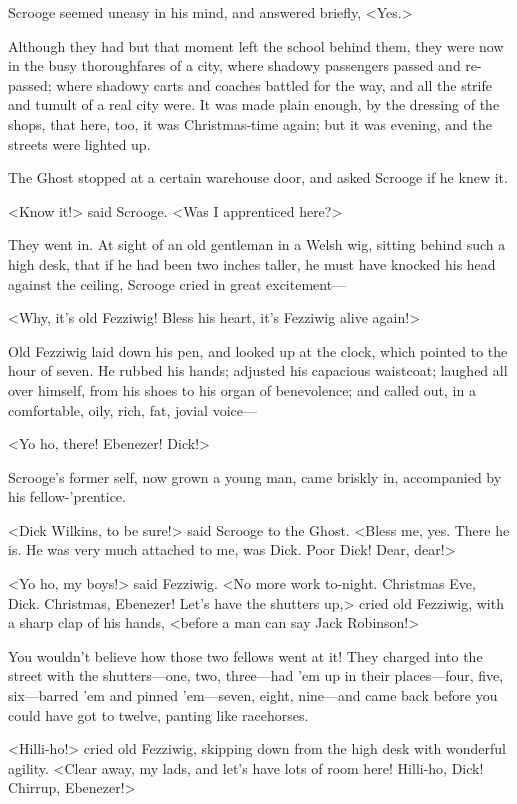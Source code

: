 Scrooge seemed uneasy in his mind, and answered briefly, <Yes.>

Although they had but that moment left the school behind them, they were now in the busy thoroughfares of a city, where shadowy passengers passed and re-passed; where shadowy carts and coaches battled for the way, and all the strife and tumult of a real city were. It was made plain enough, by the dressing of the shops, that here, too, it was Christmas-time again; but it was evening, and the streets were lighted up.

The Ghost stopped at a certain warehouse door, and asked Scrooge if he knew it.

<Know it!> said Scrooge. <Was I apprenticed here?>

They went in. At sight of an old gentleman in a Welsh wig, sitting behind such a high desk, that if he had been two inches taller, he must have knocked his head against the ceiling, Scrooge cried in great excitement— 

<Why, it's old Fezziwig! Bless his heart, it's Fezziwig alive again!>

Old Fezziwig laid down his pen, and looked up at the clock, which pointed to the hour of seven. He rubbed his hands; adjusted his capacious waistcoat; laughed all over himself, from his shoes to his organ of benevolence; and called out, in a comfortable, oily, rich, fat, jovial voice— 

<Yo ho, there! Ebenezer! Dick!>

Scrooge's former self, now grown a young man, came briskly in, accompanied by his fellow-'prentice.

<Dick Wilkins, to be sure!> said Scrooge to the Ghost. <Bless me, yes. There he is. He was very much attached to me, was Dick. Poor Dick! Dear, dear!>

<Yo ho, my boys!> said Fezziwig. <No more work to-night. Christmas Eve, Dick. Christmas, Ebenezer! Let's have the shutters up,> cried old Fezziwig, with a sharp clap of his hands, <before a man can say Jack Robinson!>

You wouldn't believe how those two fellows went at it! They charged into the street with the shutters—one, two, three—had 'em up in their places—four, five, six—barred 'em and pinned 'em—seven, eight, nine—and came back before you could have got to twelve, panting like racehorses.

<Hilli-ho!> cried old Fezziwig, skipping down from the high desk with wonderful agility. <Clear away, my lads, and let's have lots of room here! Hilli-ho, Dick! Chirrup, Ebenezer!>

